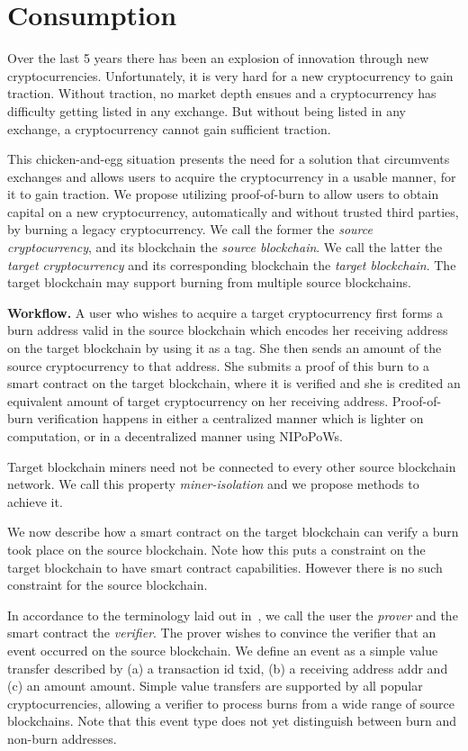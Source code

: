 \section{Consumption}

Over the last 5 years there has been an explosion of innovation through new cryptocurrencies. Unfortunately, it is very hard for a new cryptocurrency to gain traction. Without traction, no market depth ensues and a cryptocurrency has difficulty getting listed in any exchange. But without being listed in any exchange, a cryptocurrency cannot gain sufficient traction.

This chicken-and-egg situation presents the need for a solution that circumvents exchanges and allows users to acquire the cryptocurrency in a usable manner, for it to gain traction. We propose utilizing proof-of-burn to allow users to obtain capital on a new cryptocurrency, automatically and without trusted third parties, by burning a legacy cryptocurrency. We call the former the \emph{source cryptocurrency}, and its blockchain the \emph{source blockchain}. We call the latter the \emph{target cryptocurrency} and its corresponding blockchain the \emph{target blockchain}. The target blockchain may support burning from multiple source blockchains.

\noindent
\textbf{Workflow.}
A user who wishes to acquire a target cryptocurrency first forms a burn address valid in the source blockchain which encodes her receiving address on the target blockchain by using it as a tag. She then sends an amount of the source cryptocurrency to that address. She submits a proof of this burn to a smart contract on the target blockchain, where it is verified and she is credited an equivalent amount of target cryptocurrency on her receiving address. Proof-of-burn verification happens in either a centralized manner which is lighter on computation, or in a decentralized manner using NIPoPoWs.

Target blockchain miners need not be connected to every other source blockchain network. We call this property \emph{miner-isolation} and we propose methods to achieve it.

We now describe how a smart contract on the target blockchain can verify a burn took place on the source blockchain. Note how this puts a constraint on the target blockchain to have smart contract capabilities. However there is no such constraint for the source blockchain.

In accordance to the terminology laid out in~\cite{pow-sidechains}, we call the user the \emph{prover} and the smart contract the \emph{verifier}. The prover wishes to convince the verifier that an event occurred on the source blockchain. We define an event as a simple value transfer described by (a) a transaction id \textsf{txid}, (b) a receiving address \textsf{addr} and (c) an amount \textsf{amount}. Simple value transfers are supported by all popular cryptocurrencies, allowing a verifier to process burns from a wide range of source blockchains. Note that this event type does not yet distinguish between burn and non-burn addresses.


